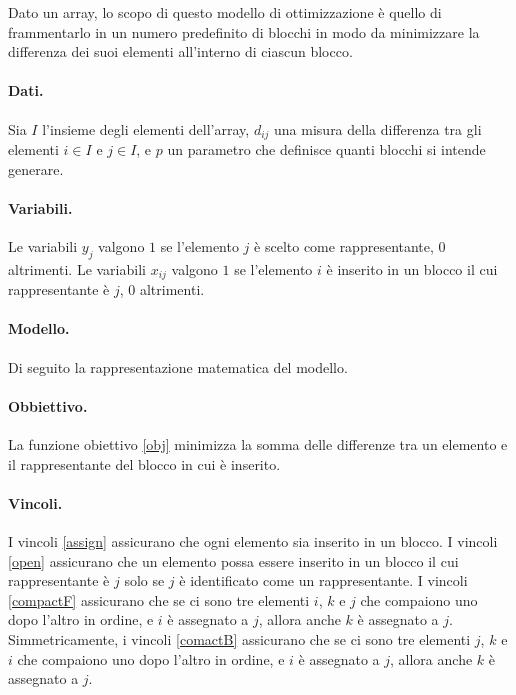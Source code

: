 Dato un array, lo scopo di questo modello di ottimizzazione è quello di frammentarlo in un numero predefinito di blocchi in modo da minimizzare la differenza dei suoi elementi all'interno di ciascun blocco.

\paragraph{Dati.} Sia $I$ l'insieme degli elementi dell'array, $d_{ij}$ una misura della differenza tra gli elementi $i \in I$ e $j \in I$, e $p$ un parametro che definisce quanti blocchi si intende generare.

\paragraph{Variabili.} Le variabili $y_j$ valgono $1$ se l'elemento $j$ è scelto come rappresentante, $0$ altrimenti. Le variabili $x_{ij}$ valgono $1$ se l'elemento $i$ è inserito in un blocco il cui rappresentante è $j$, $0$ altrimenti.

\paragraph{Modello.} Di seguito la rappresentazione matematica del modello.



\paragraph{Obbiettivo.} La funzione obiettivo \eqref{obj} minimizza la somma delle differenze tra un elemento e il rappresentante del blocco in cui è inserito.

\paragraph{Vincoli.} I vincoli \eqref{assign} assicurano che ogni elemento sia inserito in un blocco. I vincoli \eqref{open} assicurano che un elemento possa essere inserito in un blocco il cui rappresentante è $j$ solo se $j$ è identificato come un rappresentante. I vincoli \eqref{compactF} assicurano che se ci sono tre elementi $i$, $k$ e $j$ che compaiono uno dopo l'altro in ordine, e $i$ è assegnato a $j$, allora anche $k$ è assegnato a $j$. Simmetricamente, i vincoli \eqref{comactB} assicurano che se ci sono tre elementi $j$, $k$ e $i$ che compaiono uno dopo l'altro in ordine, e $i$ è assegnato a $j$, allora anche $k$ è assegnato a $j$.
